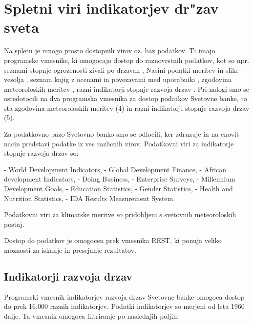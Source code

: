 \chapter{Spletni viri indikatorjev dr"zav sveta}

Na spletu je mnogo prosto dostopnih virov oz. baz podatkov. Ti imajo programske
vmesnike, ki omogocajo dostop do raznovrstnih podatkov, kot so npr. seznami 
stopnje ogrozenosti zivali po drzavah 
,
Nasini podatki meritev in slike vesolja
,
seznam knjig z ocenami in povezavami med uporabniki
,
zgodovina meteoroloskih meritev
,
razni indikatorji stopnje razvoja drzav
.
Pri nalogi smo se osredotocili na dva programska vmesnika za dostop podatkov 
Svetovne banke, to sta zgodovina meteoroloskih meritev (4) in razni 
indikatorji stopnje razvoja drzav (5).


% 
% 
% 
% 


Za podatkovno bazo Svetovno banko smo se odlocili, ker zdruzuje in na enovit
nacin predstavi podatke iz vec razlicnih virov. Podatkovni viri za indikatorje
stopnje razvoja drzav so:

- World Development Indicators, 
- Global Development Finance, 
- African development Indicators, 
- Doing Business,
- Enterprise Surveys, 
- Millennium Development Goals, 
- Education Statistics, 
- Gender Statistics,
- Health and Nutrition Statistics, 
- IDA Results Measurement System.

Podatkovni viri za klimatske meritve so pridobljeni s svetovnih meteoroloskih 
postaj.


Dostop do podatkov je omogocen prek vmesnika REST, ki ponuja veliko moznosti 
za iskanje in presejanje rezultatov.





\section{Indikatorji razvoja drzav}

Programski vmesnik indikatorjev razvoja drzav Svetovne banke omogoca dostop
do prek 16.000 raznih indikatorjev. Podatki indikatorjev so merjeni od leta
1960 dalje. Ta vmesnik omogoca filtriranje po naslednjih poljih:

